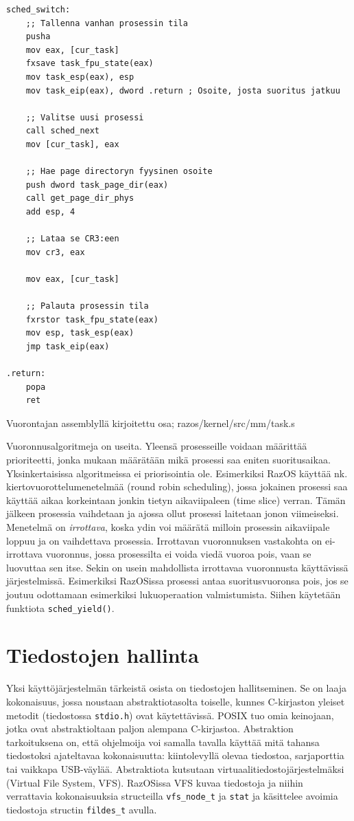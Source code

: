 \begin{listing}[H]
\begin{verbatim}
sched_switch:
    ;; Tallenna vanhan prosessin tila
    pusha
    mov eax, [cur_task]
    fxsave task_fpu_state(eax)
    mov task_esp(eax), esp
    mov task_eip(eax), dword .return ; Osoite, josta suoritus jatkuu

    ;; Valitse uusi prosessi
    call sched_next
    mov [cur_task], eax

    ;; Hae page directoryn fyysinen osoite
    push dword task_page_dir(eax)
    call get_page_dir_phys
    add esp, 4

    ;; Lataa se CR3:een
    mov cr3, eax

    mov eax, [cur_task]

    ;; Palauta prosessin tila
    fxrstor task_fpu_state(eax)
    mov esp, task_esp(eax)
    jmp task_eip(eax)

.return:
    popa
    ret
\end{verbatim}
\caption{Vuorontajan assemblyllä kirjoitettu osa; razos/kernel/src/mm/task.s}
\label{lst:sched_switch}
\end{listing}

\par

Vuoronnusalgoritmeja on useita. Yleensä prosesseille voidaan määrittää prioriteetti, jonka mukaan määrätään mikä prosessi saa eniten suoritusaikaa. Yksinkertaisissa algoritmeissa ei priorisointia ole. Esimerkiksi RazOS käyttää nk. kiertovuorottelumenetelmää (round robin scheduling), jossa jokainen prosessi saa käyttää aikaa korkeintaan jonkin tietyn aikaviipaleen (time slice) verran. Tämän jälkeen prosessia vaihdetaan ja ajossa ollut prosessi laitetaan jonon viimeiseksi. Menetelmä on \textit{irrottava}, koska ydin voi määrätä milloin prosessin aikaviipale loppuu ja on vaihdettava prosessia. Irrottavan vuoronnuksen vastakohta on ei-irrottava vuoronnus, jossa prosessilta ei voida viedä vuoroa pois, vaan se luovuttaa sen itse. Sekin on usein mahdollista irrottavaa vuoronnusta käyttävissä järjestelmissä. Esimerkiksi RazOSissa prosessi antaa suoritusvuoronsa pois, jos se joutuu odottamaan esimerkiksi lukuoperaation valmistumista. Siihen käytetään funktiota \texttt{sched\_yield()}.

\section{Tiedostojen hallinta}

Yksi käyttöjärjestelmän tärkeistä osista on tiedostojen hallitseminen. Se on laaja kokonaisuus, jossa noustaan abstraktiotasolta toiselle, kunnes C-kirjaston yleiset metodit (tiedostossa \texttt{stdio.h}) ovat käytettävissä. POSIX tuo omia keinojaan, jotka ovat abstraktioltaan paljon alempana C-kirjastoa. Abstraktion tarkoituksena on, että ohjelmoija voi samalla tavalla käyttää mitä tahansa tiedostoksi ajateltavaa kokonaisuutta: kiintolevyllä olevaa tiedostoa, sarjaporttia tai vaikkapa USB-väylää. Abstraktiota kutsutaan virtuaalitiedostojärjestelmäksi (Virtual File System, VFS). RazOSissa VFS kuvaa tiedostoja ja niihin verrattavia kokonaisuuksia structeilla \texttt{vfs\_node\_t} ja \texttt{stat} ja käsittelee avoimia tiedostoja structin \texttt{fildes\_t} avulla.

